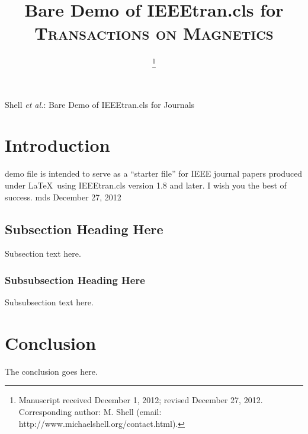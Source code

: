 \documentclass[journal,transmag]{IEEEtran}
\begin{document}
\title{Bare Demo of IEEEtran.cls for \textsc{Transactions on Magnetics}}
\author{
\thanks{Manuscript received December 1, 2012; revised December 27, 2012. 
Corresponding author: M. Shell (email: http://www.michaelshell.org/contact.html).}}
%
{Shell \MakeLowercase{\textit{et al.}}: Bare Demo of IEEEtran.cls for Journals}
\maketitle
\IEEEdisplaynontitleabstractindextext
\IEEEpeerreviewmaketitle
\section{Introduction}
 demo file is intended to serve as a ``starter file''
for IEEE journal papers produced under \LaTeX\ using
IEEEtran.cls version 1.8 and later.
I wish you the best of success.
\hfill mds
\hfill December 27, 2012
\subsection{Subsection Heading Here}
Subsection text here.
\subsubsection{Subsubsection Heading Here}
Subsubsection text here.
\section{Conclusion}
The conclusion goes here.
\appendices
\end{document}

